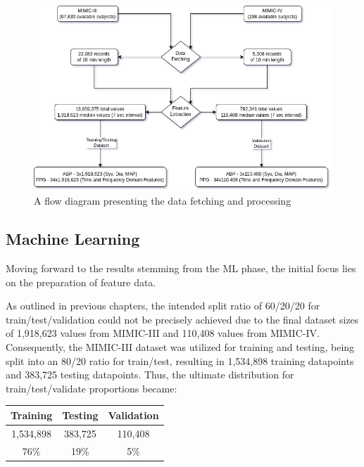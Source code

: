 \vspace{1cm}
\begin{figure}[h]
    \centering
    \includegraphics[width=\textwidth]{images/results/flow}
    \caption{A flow diagram presenting the data fetching and processing}
    \label{fig:data_flow}
\end{figure}

\newpage

\subsection{Machine Learning}
\label{subsec:machine_learning}

Moving forward to the results stemming from the ML phase, the initial focus lies on the preparation of feature data.

As outlined in previous chapters, the intended split ratio of 60/20/20 for train/test/validation could not be precisely achieved due to the final dataset sizes of 1,918,623 values from MIMIC-III and 110,408 values from MIMIC-IV\@.
Consequently, the MIMIC-III dataset was utilized for training and testing, being split into an 80/20 ratio for train/test, resulting in 1,534,898 training datapoints and 383,725 testing datapoints.
Thus, the ultimate distribution for train/test/validate proportions became:

\begin{center}
    \renewcommand{\arraystretch}{1.2}
    \setlength{\tabcolsep}{12pt}
    \begin{tabular}{|c|c|c|}
        \hline
        Training  & Testing & Validation \\
        \hline
        1,534,898 & 383,725 & 110,408    \\
        \hline
        76\%      & 19\%    & 5\%        \\
        \hline
    \end{tabular}
\end{center}

